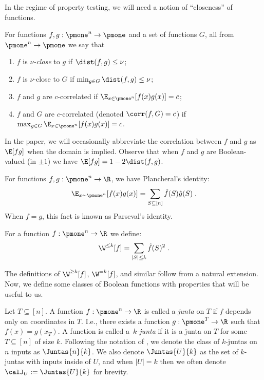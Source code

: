 In the regime of property testing, we will need a notion of ``closeness''  of functions.
\begin{definition}
For functions $f,g: \pmone^n \to \pmone$ and a set of functions $G$, all from $\pmone^n \to \pmone$ we say that
\begin{enumerate}
    \item $f$ is \emph{$\nu$-close} to $g$ if $\dist(f,g) \leq \nu$;
    \item $f$ is $\nu$-close to $G$ if $\min_{g \in G}\dist(f,g) \leq \nu$;
    \item $f$ and $g$ are $c$-correlated if $\E_{x \in \pmone^n}[f(x)g(x)]  = c$;
    \item $f$ and $G$ are $c$-correlated (denoted $\corr(f,G) = c$) if $\max_{g \in G} \E_{x \in \pmone^n}[f(x)g(x)]  = c$. 
\end{enumerate}
\end{definition}
In the paper, we will occasionally abbreviate the correlation between $f$ and $g$ as $\E[fg]$ when the domain is implied. Observe that when $f$ and $g$ are Boolean-valued (in $\pm 1$) we have $\E[fg] = 1-2\dist(f,g)$.
\begin{fact}
For functions $f,g: \pmone^n \to \R$, we have Plancheral's identity:
$$
\E_{x\sim\pmone^n}[f(x)g(x)] = \sum_{S \subseteq[n]} \hat f(S) \hat g(S)\;.
$$
When $f = g$, this fact is known as Parseval's identity.
\end{fact}
\begin{definition}
For a function $f: \pmone^n \to \R$ we define:
    $$ \W^{\leq k}[f] = \sum_{|S| \leq k} \hat f(S)^2\;.$$
\end{definition}
The definitions of $\W^{\geq k}[f]$, $\W^{=k}[f]$, and similar follow from a natural extension. Now, we define some classes of Boolean functions with properties that will be useful to us.
\begin{definition}[Junta]
Let $T\subseteq [n]$. A function $f: \pmone^n \to \R$ is called a \emph{junta} on $T$ if $f$ depends only on coordinates in $T$. I.e., there exists a function $g: \pmone^T \to \R$ such that $f(x) = g(x_T)$.
A function is called a~\emph{$k$-junta} if it is a junta on $T$ for some $T\subseteq[n]$ of size $k$. 
Following the notation of \cite{junta-coordinate-oracles}, we denote the class of $k$-juntas on $n$ inputs as $\Juntas{n}{k}$. We also denote $\Juntas{U}{k}$ as the set of $k$-juntas with inputs inside of $U$, and when $|U| = k$ then we often denote $\calJ_U:= \Juntas{U}{k}$ for brevity. 
%
%
\end{definition}


